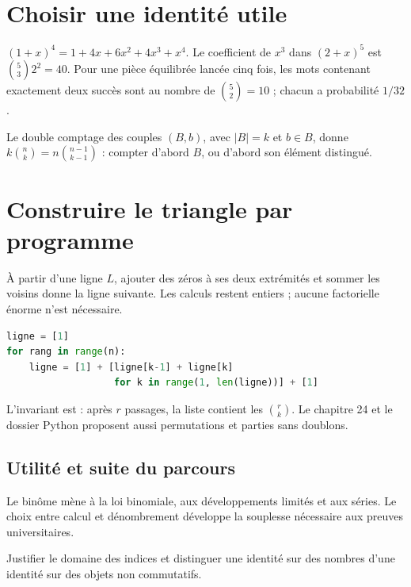 \documentclass[../cours_tle.tex]{subfiles}
\begin{document}
\section{Choisir une identité utile}
\begin{exemple}
$(1+x)^4=1+4x+6x^2+4x^3+x^4$.
Le coefficient de $x^3$ dans $(2+x)^5$ est $\binom53 2^2=40$.
Pour une pièce équilibrée lancée cinq fois, les mots contenant exactement deux succès sont au nombre de $\binom52=10$ ; chacun a probabilité $1/32$.
\end{exemple}
Le double comptage des couples $(B,b)$, avec $|B|=k$ et $b\in B$, donne
$k\binom nk=n\binom{n-1}{k-1}$ : compter d'abord $B$, ou d'abord son élément distingué.
\section{Construire le triangle par programme}
À partir d'une ligne $L$, ajouter des zéros à ses deux extrémités et sommer les voisins donne la ligne suivante. Les calculs restent entiers ; aucune factorielle énorme n'est nécessaire.
\begin{lstlisting}[language=Python]
ligne = [1]
for rang in range(n):
    ligne = [1] + [ligne[k-1] + ligne[k]
                   for k in range(1, len(ligne))] + [1]
\end{lstlisting}
L'invariant est : après $r$ passages, la liste contient les $\binom rk$. Le chapitre 24 et le dossier Python proposent aussi permutations et parties sans doublons.
\begin{finchapitre}
\section{Utilité et suite du parcours}
Le binôme mène à la loi binomiale, aux développements limités et aux séries. Le choix entre calcul et dénombrement développe la souplesse nécessaire aux preuves universitaires.
\begin{retenir}
Justifier le domaine des indices et distinguer une identité sur des nombres d'une identité sur des objets non commutatifs.
\end{retenir}
\end{finchapitre}
\end{document}

